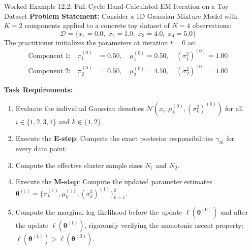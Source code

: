 \begin{examplebox}[breakable]{Worked Example 12.2: Full Cycle Hand-Calculated EM Iteration on a Toy Dataset}
\textbf{Problem Statement:}
Consider a 1D Gaussian Mixture Model with $K = 2$ components applied to a concrete toy dataset of $N = 4$ observations:
\begin{equation}
\mathcal{D} = \{x_1 = 0.0, \; x_2 = 1.0, \; x_3 = 4.0, \; x_4 = 5.0\}
\end{equation}
The practitioner initializes the parameters at iteration $t = 0$ as:
\begin{align}
\text{Component 1:} \quad \pi_1^{(0)} &= 0.50, \quad \mu_1^{(0)} = 0.50, \quad (\sigma_1^2)^{(0)} = 1.00 \\
\text{Component 2:} \quad \pi_2^{(0)} &= 0.50, \quad \mu_2^{(0)} = 4.50, \quad (\sigma_2^2)^{(0)} = 1.00
\end{align}

\textbf{Task Requirements:}
\begin{enumerate}
    \item Evaluate the individual Gaussian densities $\mathcal{N}(x_i; \mu_k^{(0)}, (\sigma_k^2)^{(0)})$ for all $i \in \{1, 2, 3, 4\}$ and $k \in \{1, 2\}$.
    \item Execute the \textbf{E-step}: Compute the exact posterior responsibilities $\gamma_{ik}$ for every data point.
    \item Compute the effective cluster sample sizes $N_1$ and $N_2$.
    \item Execute the \textbf{M-step}: Compute the updated parameter estimates $\boldsymbol{\theta}^{(1)} = \{\pi_k^{(1)}, \mu_k^{(1)}, (\sigma_k^2)^{(1)}\}_{k=1}^2$.
    \item Compute the marginal log-likelihood before the update $\ell(\boldsymbol{\theta}^{(0)})$ and after the update $\ell(\boldsymbol{\theta}^{(1)})$, rigorously verifying the monotonic ascent property: $\ell(\boldsymbol{\theta}^{(1)}) > \ell(\boldsymbol{\theta}^{(0)})$.
\end{enumerate}

\tcblower


\end{examplebox}
